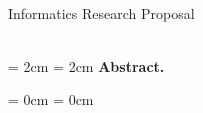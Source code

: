 \thispagestyle{plain}

\begin{center}
  \Large
  \textbf{\@title}\\
  \vspace{.5em}
  \normalsize
  Informatics Research Proposal\\
  \@author\\
  \@date
\end{center}

\newcommand{\abstractmargin}{2cm}

\leftskip  = \abstractmargin
\rightskip = \abstractmargin
\noindent
\textbf{Abstract.}

\leftskip  = 0cm
\rightskip = 0cm
